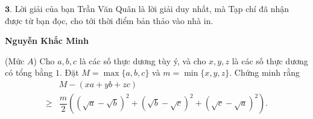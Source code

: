 \begin{multicols}{2}
	\vskip 0.05cm
	$\pmb{3.}$ Lời giải của bạn Trần Văn Quân là lời giải duy nhất, mà Tạp chí đã nhận được từ bạn đọc, cho tới thời điểm bản thảo vào nhà in.
	\begin{flushright}
		\textbf{\color{thachthuctoanhoc}Nguyễn Khắc Minh}
	\end{flushright}
	{}
	(Mức $A$) Cho $a, b, c$ là các số thực dương tùy ý, và cho $x, y, z$ là các số thực dương có tổng bằng $1$. Đặt $M = \max\{a, b, c\}$ và $m = \min\{x, y, z\}$. Chứng minh rằng
		\begin{align*}
		&M-(xa+y b+z c) \\
		\ge&\dfrac m2\!\!\left(\!\!(\!\sqrt{a}\!-\!\!\sqrt{b})^{2}\!\!+\!(\sqrt{b}\!-\!\!\sqrt{\!c})^{2}\!+\!\!(\sqrt{\!c}\!-\!\sqrt{a})^{2}\!\right).
	\end{align*}


\end{multicols}
